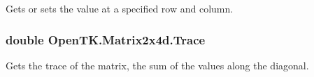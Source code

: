 Gets or sets the value at a specified row and column. 

\hypertarget{struct_open_t_k_1_1_matrix2x4d_a8756b543bb600eaa9e2205b5565ee09b}{
\subsubsection[{Trace}]{\setlength{\rightskip}{0pt plus 5cm}double Open\-T\-K.\-Matrix2x4d.\-Trace\hspace{0.3cm}{\ttfamily [get]}}}\label{struct_open_t_k_1_1_matrix2x4d_a8756b543bb600eaa9e2205b5565ee09b}


Gets the trace of the matrix, the sum of the values along the diagonal. 

